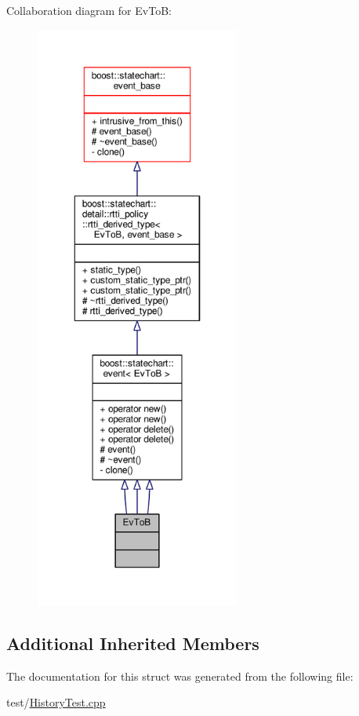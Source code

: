 Collaboration diagram for Ev\+ToB\+:
\nopagebreak
\begin{figure}[H]
\begin{center}
\leavevmode
\includegraphics[height=550pt]{struct_ev_to_b__coll__graph}
\end{center}
\end{figure}
\subsection*{Additional Inherited Members}


The documentation for this struct was generated from the following file\+:\begin{DoxyCompactItemize}
\item 
test/\mbox{\hyperlink{_history_test_8cpp}{History\+Test.\+cpp}}\end{DoxyCompactItemize}
